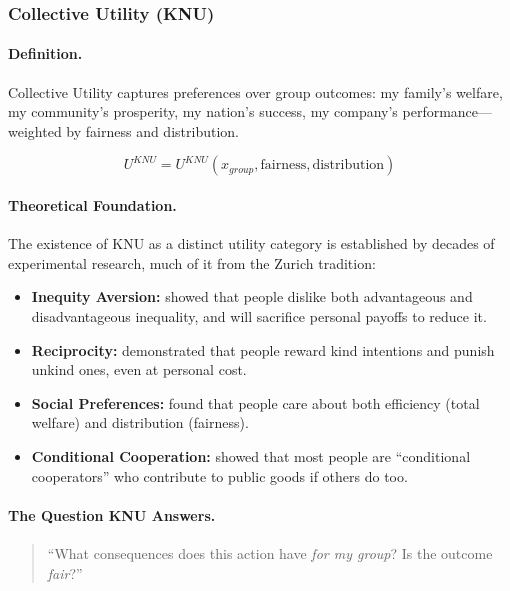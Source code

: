 \subsubsection{Collective Utility (KNU)}

\paragraph{Definition.}
Collective Utility captures preferences over group outcomes:
my family's welfare, my community's prosperity, my nation's success,
my company's performance---weighted by fairness and distribution.

\begin{equation}
U^{KNU} = U^{KNU}(x_{group}, \text{fairness}, \text{distribution})
\end{equation}

\paragraph{Theoretical Foundation.}
The existence of KNU as a distinct utility category is established by
decades of experimental research, much of it from the Zurich tradition:

\begin{itemize}
\item \textbf{Inequity Aversion:} \citet{PAP-fehr1999theory} showed that people 
dislike both advantageous and disadvantageous inequality, and will sacrifice 
personal payoffs to reduce it.

\item \textbf{Reciprocity:} \citet{PAP-falk2006theory} demonstrated that people 
reward kind intentions and punish unkind ones, even at personal cost.

\item \textbf{Social Preferences:} \citet{charness2002understanding} found that 
people care about both efficiency (total welfare) and distribution (fairness).

\item \textbf{Conditional Cooperation:} \citet{fischbacher2001people} showed that 
most people are ``conditional cooperators'' who contribute to public goods 
if others do too.
\end{itemize}

\paragraph{The Question KNU Answers.}
\begin{quote}
``What consequences does this action have \emph{for my group}?
Is the outcome \emph{fair}?''
\end{quote}

